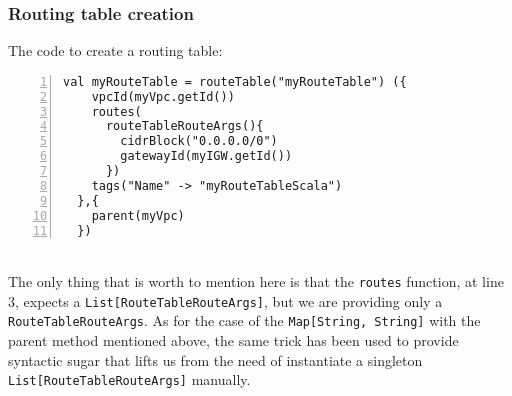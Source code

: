 \subsubsection{Routing table creation}
\label{sssec:routetable-creation-scala}
The code to create a routing table:
\begin{lstlisting}[numbers=left, numberstyle=\tiny, numbersep=-5pt, stepnumber=1]
  val myRouteTable = routeTable("myRouteTable") ({
    vpcId(myVpc.getId())
    routes(
      routeTableRouteArgs(){
        cidrBlock("0.0.0.0/0")
        gatewayId(myIGW.getId())
      })
    tags("Name" -> "myRouteTableScala")
  },{
    parent(myVpc)
  })
\end{lstlisting}\mbox{}\\
The only thing that is worth to mention here is that the \texttt{routes} function, at line 3, expects a \texttt{List[RouteTableRouteArgs]}, but we are providing only a \texttt{RouteTableRouteArgs}.
As for the case of the \texttt{Map[String, String]} with the parent method mentioned above, the same trick has been used to provide syntactic sugar that lifts us from the need of instantiate a singleton \texttt{List[RouteTableRouteArgs]} manually.

